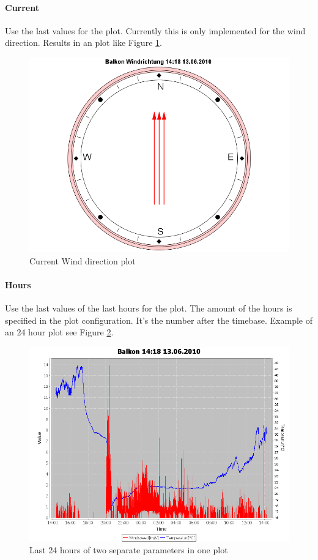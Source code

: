 \paragraph{Current} %
\label{par:current}
Use the last values for the plot. Currently this is only implemented for the wind direction. Results in an plot like Figure \ref{fig:current}.
\begin{figure}[ht]
    \centering
    \includegraphics[width=0.9\linewidth]{master/plot_examplec.png}
    \caption{Current Wind direction plot}
    \label{fig:current}
\end{figure}

\paragraph{Hours} %
\label{par:hours}
Use the last values of the last hours for the plot. The amount of the hours is specified in the plot configuration. It's the number after the timebase. Example of an 24 hour plot see Figure \ref{fig:hours}.
\begin{figure}[ht]
    \centering
    \includegraphics[width=0.9\linewidth]{master/plot_exampleh.png}
    \caption{Last 24 hours of two separate parameters in one plot}
    \label{fig:hours}
\end{figure}

